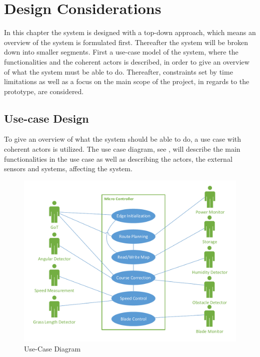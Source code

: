 \chapter{Design Considerations}
\vspace{-5 mm}
In this chapter the system is designed with a top-down approach, which means an overview of the system is formulated first. Thereafter the system will be broken down into smaller segments. First a use-case model of the system, where the functionalities and the coherent actors is described, in order to give an overview of what the system must be able to do. Thereafter, constraints set by time limitations as well as a focus on the main scope of the project, in regards to the prototype, are considered.
\vspace{-4 mm}
\section{Use-case Design} \label{sec:UseCase}
To give an overview of what the system should be able to do, a use case with coherent actors is utilized. The use case diagram, see , will describe the main functionalities in the use case as well as describing the actors, the external sensors and systems, affecting the system.


\vspace{-3 mm}
 \begin{figure}[H]
	\centering
	\includegraphics[scale=0.8]{figures/P5UseCase.pdf}
	\caption{Use-Case Diagram}
	\label{fig:usecase}
\end{figure}

